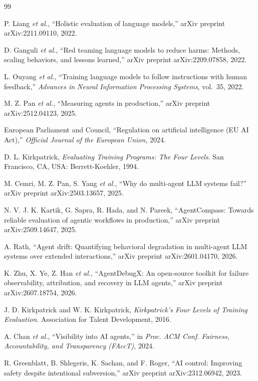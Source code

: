 \documentclass[conference]{IEEEtran}
\begin{document}
\begin{thebibliography}{99}
\scriptsize

P. Liang \emph{et al.}, ``Holistic evaluation of language models,'' arXiv
preprint arXiv:2211.09110, 2022.

D. Ganguli \emph{et al.}, ``Red teaming language models to reduce harms:
Methods, scaling behaviors, and lessons learned,'' arXiv preprint
arXiv:2209.07858, 2022.

L. Ouyang \emph{et al.}, ``Training language models to follow instructions with
human feedback,'' \emph{Advances in Neural Information Processing Systems},
vol.~35, 2022.

M. Z. Pan \emph{et al.}, ``Measuring agents in production,'' arXiv preprint
arXiv:2512.04123, 2025.

European Parliament and Council, ``Regulation on artificial intelligence (EU AI
Act),'' \emph{Official Journal of the European Union}, 2024.

D. L. Kirkpatrick, \emph{Evaluating Training Programs: The Four Levels}. San
Francisco, CA, USA: Berrett-Koehler, 1994.

M. Cemri, M. Z. Pan, S. Yang \emph{et al.}, ``Why do multi-agent LLM systems
fail?'' arXiv preprint arXiv:2503.13657, 2025.

N. V. J. K. Kartik, G. Sapra, R. Hada, and N. Pareek, ``AgentCompass: Towards
reliable evaluation of agentic workflows in production,'' arXiv preprint
arXiv:2509.14647, 2025.

A. Rath, ``Agent drift: Quantifying behavioral degradation in multi-agent LLM
systems over extended interactions,'' arXiv preprint arXiv:2601.04170, 2026.

K. Zhu, X. Ye, Z. Han \emph{et al.}, ``AgentDebugX: An open-source toolkit for
failure observability, attribution, and recovery in LLM agents,'' arXiv
preprint arXiv:2607.18754, 2026.

J. D. Kirkpatrick and W. K. Kirkpatrick, \emph{Kirkpatrick's Four Levels of
Training Evaluation}. Association for Talent Development, 2016.

A. Chan \emph{et al.}, ``Visibility into AI agents,'' in \emph{Proc. ACM Conf.
Fairness, Accountability, and Transparency (FAccT)}, 2024.

R. Greenblatt, B. Shlegeris, K. Sachan, and F. Roger, ``AI control: Improving
safety despite intentional subversion,'' arXiv preprint arXiv:2312.06942, 2023.


\end{thebibliography}
\end{document}
